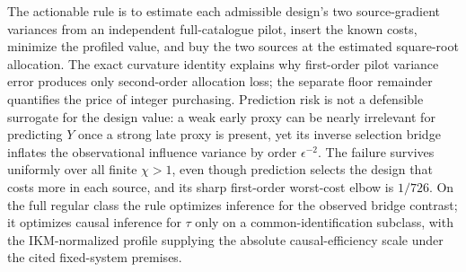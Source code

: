 The actionable rule is to estimate each admissible design's two source-gradient variances from an independent full-catalogue pilot, insert the known costs, minimize the profiled value, and buy the two sources at the estimated square-root allocation. The exact curvature identity explains why first-order pilot variance error produces only second-order allocation loss; the separate floor remainder quantifies the price of integer purchasing. Prediction risk is not a defensible surrogate for the design value: a weak early proxy can be nearly irrelevant for predicting \(Y\) once a strong late proxy is present, yet its inverse selection bridge inflates the observational influence variance by order \(\epsilon^{-2}\). The failure survives uniformly over all finite \(\chi>1\), even though prediction selects the design that costs more in each source, and its sharp first-order worst-cost elbow is \(1/726\). On the full regular class the rule optimizes inference for the observed bridge contrast; it optimizes causal inference for \(\tau\) only on a common-identification subclass, with the IKM-normalized profile supplying the absolute causal-efficiency scale under the cited fixed-system premises.